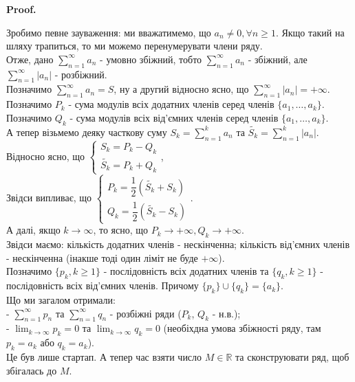 \documentclass[a4paper, 10pt]{article}
\makeatletter
\def\huge{\displaystyle}
\def\qed{$\blacksquare$}
\theoremstyle{theoremdd}
\theoremstyle{theoremdd}
\theoremstyle{theoremdd}
\theoremstyle{theoremdd}
\theoremstyle{theoremdd}
\theoremstyle{theoremdd}
\theoremstyle{theoremdd}
\theoremstyle{theoremdd}
\theoremstyle{theoremdd}
\renewenvironment{proof}[1][Proof.\\]{\par
\pushQED{\hfill \qed}%
\normalfont \topsep6\p@\@plus6\p@\relax
\trivlist
\item\relax
{\bfseries
#1\@addpunct{.}}\hspace\labelsep\ignorespaces
}{%
\popQED\endtrivlist\@endpefalse
}
\makeatother
\begin{document}
\iffalse
\begin{proof}
Зробимо певне зауваження: ми вважатимемо, що $a_n \neq 0, \forall n \geq 1$. Якщо такий на шляху трапиться, то ми можемо перенумерувати члени ряду.
\bigskip \\
Отже, дано $\huge \sum_{n=1}^\infty a_n$ - умовно збіжний, тобто $\huge\sum_{n=1}^\infty a_n$ - збіжний, але $\huge\sum_{n=1}^\infty |a_n|$ - розбіжний.\\
Позначимо $\huge\sum_{n=1}^\infty a_n = S$, ну а другий відносно ясно, що $\huge\sum_{n=1}^\infty |a_n| = +\infty$.\\
Позначимо $P_k$ - сума модулів всіх додатних членів серед членів $\{a_1,\dots,a_k\}$.\\
Позначимо $Q_k$ - сума модулів всіх від'ємних членів серед членів $\{a_1,\dots,a_k\}$.\\
А тепер візьмемо деяку часткову суму $S_k = \huge\sum_{n=1}^k a_n$ та $\tilde{S_k} = \huge\sum_{n=1}^k |a_n|$. Відносно ясно, що $\begin{cases} S_k = P_k - Q_k \\ \tilde{S_k} = P_k + Q_k \end{cases}$,\\
Звідси випливає, що $\begin{cases} P_k = \dfrac{1}{2}(\tilde{S_k} + S_k) \\ Q_k = \dfrac{1}{2}(\tilde{S_k} - S_k) \end{cases}$.\\
А далі, якщо $k \to \infty$, то ясно, що $P_k \to +\infty, Q_k \to +\infty$.\\
Звідси маємо: кількість додатних членів - нескінченна; кількість від'ємних членів - нескінченна (інакше тоді один ліміт не буде $+\infty$).\\
Позначимо $\{p_k, k \geq 1\}$ - послідовність всіх додатних членів та $\{q_k, k \geq 1\}$ - послідовність всіх від'ємних членів. Причому $\{p_k\} \cup \{q_k\} = \{a_k\}$.\\
Що ми загалом отримали:\\
- $\huge\sum_{n=1}^\infty p_n$ та $\huge\sum_{n=1}^\infty q_n$ - розбіжні ряди ($P_k$, $Q_k$ - н.в.);\\
- $\huge\lim_{k \to \infty} p_k = 0$ та $\huge\lim_{k \to \infty} q_k = 0$ (необіхдна умова збіжності ряду, там $p_k = a_k$ або $q_k = a_k$).\\
Це був лише стартап. А тепер час взяти число $M \in \mathbb{R}$ та сконструювати ряд, щоб збігалась до $M$.
\bigskip \\

\end{proof}
\end{document}
